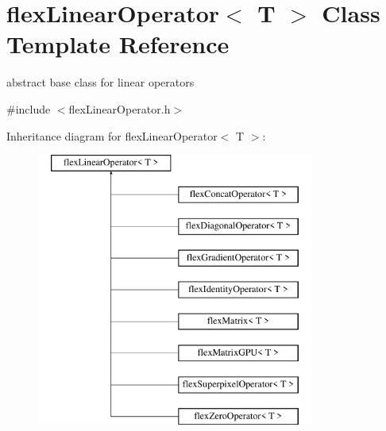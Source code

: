 \hypertarget{classflex_linear_operator}{}\section{flex\+Linear\+Operator$<$ T $>$ Class Template Reference}
\label{classflex_linear_operator}


abstract base class for linear operators  




{\ttfamily \#include $<$flex\+Linear\+Operator.\+h$>$}

Inheritance diagram for flex\+Linear\+Operator$<$ T $>$\+:\begin{figure}[H]
\begin{center}
\leavevmode
\includegraphics[height=9.000000cm]{classflex_linear_operator}
\end{center}
\end{figure}
